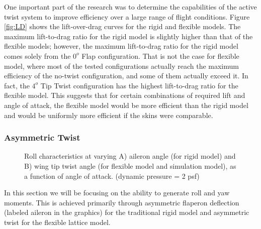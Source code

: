 \documentclass[11pt]{ucthesis}
\begin{document}
One important part of the research was to determine the capabilities of the active twist system to improve efficiency over a large range of flight conditions. Figure \ref{fig:LD} shows the lift-over-drag curves for the rigid and flexible models. The maximum lift-to-drag ratio for the rigid model is slightly higher than that of the flexible models; however, the maximum lift-to-drag ratio for the rigid model comes solely from the $0^o$ Flap configuration. That is not the case for flexible model, where most of the tested configurations actually reach the maximum efficiency of the no-twist configuration, and some of them actually exceed it. In fact, the $4^o$ Tip Twist configuration has the highest lift-to-drag ratio for the flexible model. This suggests that for certain combinations of required lift and angle of attack, the flexible model would be more efficient than the rigid model and would be uniformly more efficient if the skins were comparable.

\subsubsection{Asymmetric Twist}
\begin{figure}[thpb]
\hfill
{}
\hfill
{}
\hfill
\caption{Roll characteristics at varying A) aileron angle (for rigid model) and B) wing tip twist angle (for flexible model and simulation model), as a function of angle of attack. (dynamic pressure = 2 psf)}
\label{fig:Q2Roll}
\end{figure}

In this section we will be focusing on the ability to generate roll and yaw moments. This is achieved primarily through asymmetric flaperon deflection (labeled aileron in the graphics) for the traditional rigid model and asymmetric twist for the flexible lattice model.
\end{document}
